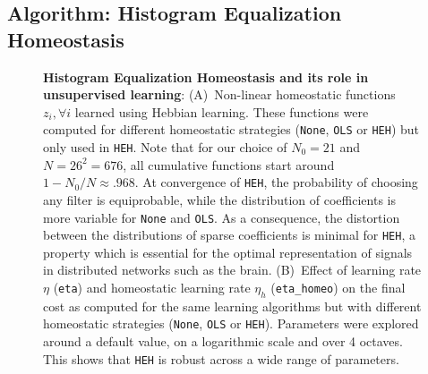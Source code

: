 \documentclass[vision,article,submit,oneauthor,pdftex]{Definitions/mdpi}
\newcommand{\seeFig}[1]{Figure~\ref{fig:#1}}%
\begin{document}
{\subsection{Algorithm: Histogram Equalization Homeostasis}\label{HEH}
\begin{figure}%
\caption{
{\bf Histogram Equalization Homeostasis and its role in unsupervised learning}:
{\sf (A)}~Non-linear homeostatic functions $z_i, \forall i$ learned using Hebbian learning. These functions were computed for different homeostatic strategies (\texttt{None}, \texttt{OLS} or \texttt{HEH}) but only used in \texttt{HEH}. Note that for our choice of $N_0=21$ and $N=26^2=676$, all cumulative functions start around $1 - N_0/N \approx .968 $. At convergence of \texttt{HEH}, the probability of choosing any filter is equiprobable, while the distribution of coefficients is more variable for \texttt{None} and \texttt{OLS}. As a consequence, the distortion between the distributions of sparse coefficients is minimal for \texttt{HEH}, a property which is essential for the optimal representation of signals in distributed networks such as the brain. %
{\sf (B)}~Effect of learning rate $\eta$ (\texttt{eta}) and homeostatic learning rate $\eta_h$ (\texttt{eta\_homeo}) on the final cost as computed for the same learning algorithms but with different homeostatic strategies (\texttt{None}, \texttt{OLS} or \texttt{HEH}). Parameters were explored around a default value, on a logarithmic scale and over 4 octaves. This shows that \texttt{HEH} is robust across a wide range of parameters.
}
\end{figure}}
\end{document}
